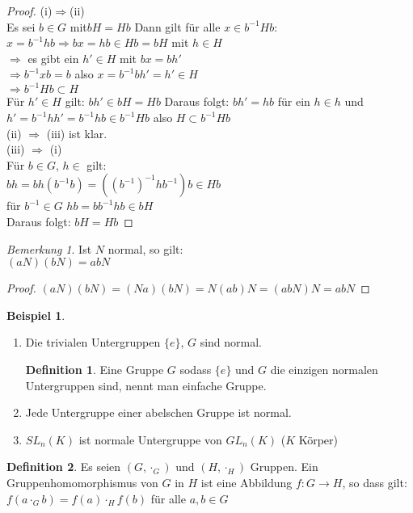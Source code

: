 \documentclass[12pt]{scrartcl}%
\theoremstyle{definition}
\newtheorem*{defn}{Definition}
\newtheorem{ex}{Beispiel}
\theoremstyle{remark}
\newtheorem*{nb}{Bemerkung}
\begin{document}
\begin{proof}
(i)$\Rightarrow$(ii)\\
Es sei $b \in G$ mit$bH=Hb$
Dann gilt für alle $x \in b^{-1}Hb$:\\
$x=b^{-1}hb \Rightarrow bx=hb \in Hb=bH$ mit $h \in H$\\
$\Rightarrow$ es gibt ein $h' \in H$ mit $bx=bh'$\\
$\Rightarrow b^{-1}xb=b$ also $x=b^{-1}bh'=h'\in H$\\
$\Rightarrow b^{-1}Hb \subset H$\\
Für $h' \in H$ gilt: $bh' \in bH = Hb$ Daraus folgt: $bh'=hb$ für ein $h \in h$ und
$h'=b^{-1}hh'=b^{-1}hb \in b^{-1}Hb$ also $H \subset b^{-1}Hb$\\
(ii) $\Rightarrow$ (iii) ist klar.\\
(iii) $\Rightarrow$ (i)\\
Für $b \in G$, $h\in $ gilt:\\
$bh=bh(b^{-1}b)=((b^{-1})^{-1}hb^{-1})b \in Hb$\\
für $b^{-1} \in G$ $hb=bb^{-1}hb \in bH$\\
Daraus folgt: $bH=Hb$
\end{proof}

\begin{nb}
Ist $N$ normal, so gilt:\\
$(aN)(bN)=abN$
\end{nb}

\begin{proof}
$(aN)(bN)=(Na)(bN)=N(ab)N=(abN)N=abN$
\end{proof}


\begin{ex}
\begin{enumerate}
\item Die trivialen Untergruppen $\{e\}$, $G$ sind normal.
	\begin{defn}
	Eine Gruppe $G$ sodass $\{e\}$ und $G$ die einzigen normalen Untergruppen sind, nennt man einfache Gruppe.
	\end{defn}
\item Jede Untergruppe einer abelschen Gruppe ist normal.
\item $SL_n(K)$ ist normale Untergruppe von $GL_n(K)$ ($K$ Körper)
\end{enumerate}
\end{ex}


\begin{defn}
Es seien $(G,\cdot_G)$ und $(H,\cdot_H)$ Gruppen. Ein Gruppenhomomorphismus von $G$ in $H$ ist eine Abbildung 
$f:G\rightarrow H$, so dass gilt:\\
$f(a\cdot_{G}b)=f(a)\cdot_{H}f(b)$ für alle $a,b\in G$ 
\end{defn}
\end{document}
